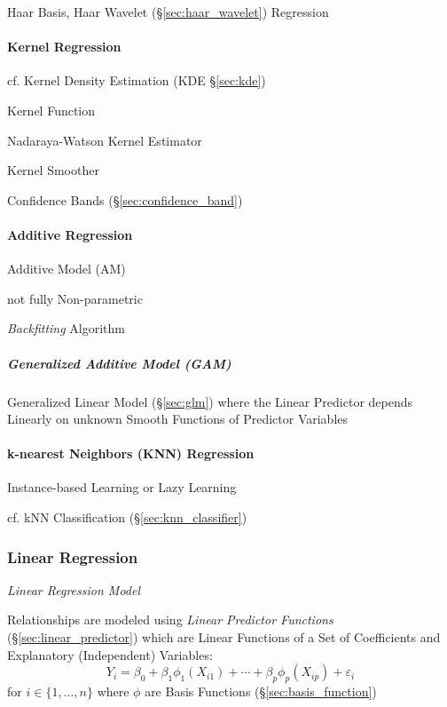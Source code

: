 Haar Basis, Haar Wavelet (\S\ref{sec:haar_wavelet}) Regression



\paragraph{Kernel Regression}\label{sec:kernel_regression}\hfill

cf. Kernel Density Estimation (KDE \S\ref{sec:kde})

Kernel Function

Nadaraya-Watson Kernel Estimator

Kernel Smoother

Confidence Bands (\S\ref{sec:confidence_band})



\paragraph{Additive Regression}\label{sec:additive_regression}\hfill

Additive Model (AM)

not fully Non-parametric

\emph{Backfitting} Algorithm



\subparagraph{Generalized Additive Model (GAM)}\label{sec:gam}\hfill

Generalized Linear Model (\S\ref{sec:glm}) where the Linear Predictor depends
Linearly on unknown Smooth Functions of Predictor Variables



\paragraph{k-nearest Neighbors (KNN) Regression}\label{sec:knn_regression}

Instance-based Learning or Lazy Learning

cf. kNN Classification (\S\ref{sec:knn_classifier})



\subsubsection{Linear Regression}\label{sec:linear_regression}

\emph{Linear Regression Model}

Relationships are modeled using \emph{Linear Predictor Functions}
(\S\ref{sec:linear_predictor}) which are Linear Functions of a Set of
Coefficients and Explanatory (Independent) Variables:
\[
  Y_i = \beta_0 + \beta_1\phi_1(X_{i1}) + \cdots +
    \beta_p\phi_p(X_{ip}) + \varepsilon_i
\]
for $i \in \{1, \ldots, n\}$ where $\phi$ are Basis Functions
(\S\ref{sec:basis_function})

